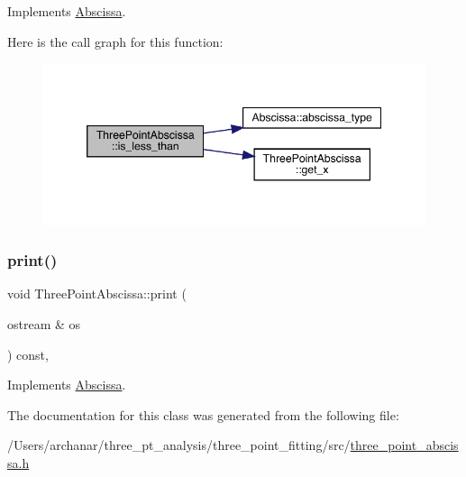 Implements \mbox{\hyperlink{classAbscissa_a399c2f7a1309368b477c767ff5f63927}{Abscissa}}.

Here is the call graph for this function\+:
\nopagebreak
\begin{figure}[H]
\begin{center}
\leavevmode
\includegraphics[width=346pt]{df/d59/classThreePointAbscissa_a2e0b64a578a1dda361a4ef3dd61f75e8_cgraph}
\end{center}
\end{figure}
\mbox{\label{classThreePointAbscissa_aa312b658c93628deb092f769246707af}} 
\subsubsection{\texorpdfstring{print()}{print()}}
{\footnotesize\ttfamily void Three\+Point\+Abscissa\+::print (\begin{DoxyParamCaption}\item[{ostream \&}]{os }\end{DoxyParamCaption}) const\hspace{0.3cm}{\ttfamily [inline]}, {\ttfamily [virtual]}}



Implements \mbox{\hyperlink{classAbscissa_a98e122d32d82979bd30338abc15768fd}{Abscissa}}.



The documentation for this class was generated from the following file\+:\begin{DoxyCompactItemize}
\item 
/\+Users/archanar/three\+\_\+pt\+\_\+analysis/three\+\_\+point\+\_\+fitting/src/\mbox{\hyperlink{three__point__abscissa_8h}{three\+\_\+point\+\_\+abscissa.\+h}}\end{DoxyCompactItemize}
